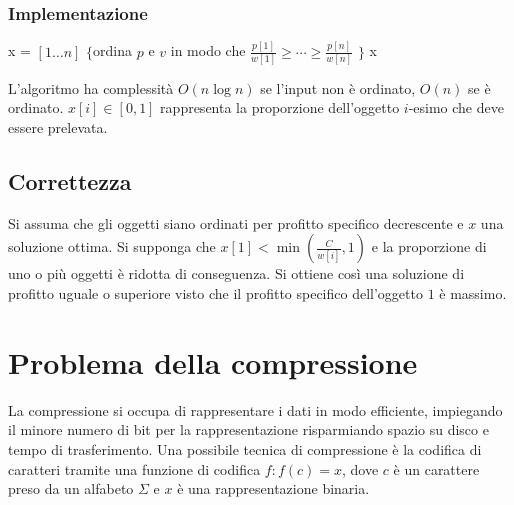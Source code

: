 \subsubsection{Implementazione}
\begin{algorithm}[H]
\DontPrintSemicolon
{}






\SetKwFunction{}{}
\SetKwFunction{}{}
\SetKwFunction{}{}
\SetKwFunction{}{}
\SetKwFunction{}{}


\caption{\protect\Float[] \protect{}}
\Float[] x = \New \Float$[1\dots n]$\;
$\{$ordina $p$ e $v$ in modo che $\frac{p[1]}{w[1]}\ge\cdots\ge\frac{p[n]}{w[n]}$ $\}$\;
\Return x\;
\end{algorithm}
L'algoritmo ha complessit\`a $O(n\log n)$ se l'input non \`e ordinato, $O(n)$ se \`e ordinato. $x[i]\in[0, 1]$ rappresenta la proporzione dell'oggetto $i$-esimo che deve essere 
prelevata.
\subsection{Correttezza}
Si assuma che gli oggetti siano ordinati per profitto specifico decrescente e $x$ una soluzione ottima. Si supponga che $x[1] < \min(\frac{C}{w[i]}, 1)$ e la proporzione di uno o pi\`u
oggetti \`e ridotta di conseguenza. Si ottiene cos\`i una soluzione di profitto uguale o superiore visto che il profitto specifico dell'oggetto $1$ \`e massimo. 
\section{Problema della compressione}
La compressione si occupa di rappresentare i dati in modo efficiente, impiegando il minore numero di bit per la rappresentazione risparmiando spazio su disco e tempo di trasferimento.
Una possibile tecnica di compressione \`e la codifica di caratteri tramite una funzione di codifica $f:f(c) = x$, dove $c$ \`e un carattere preso da un alfabeto $\Sigma$ e $x$ \`e una
rappresentazione binaria. 
